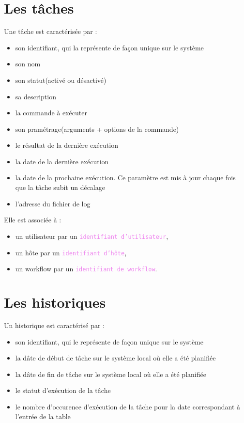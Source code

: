 \documentclass{bouygues-fr}
\begin{document}
\section{Les tâches}
Une tâche est caractérisée par :
\begin{itemize}
\item son identifiant, qui la représente de façon unique sur le système
\item son nom
\item son statut(activé ou désactivé)
\item sa description
\item la commande à exécuter
\item son pramétrage(arguments + options de la commande)
\item le résultat de la dernière exécution
\item la date de la dernière exécution
\item la date de la prochaine exécution. Ce paramètre est mis à jour chaque fois que la tâche subit un décalage
\item l'adresse du fichier de log
\end{itemize} 
 
Elle est associée à :
\begin{itemize}
\item un utilisateur par un \textcolor{violet}{\texttt{identifiant d'utilisateur}},
\item un hôte par un \textcolor{violet}{\texttt{identifiant d'hôte}},
\item un workflow par un \textcolor{violet}{\texttt{identifiant de workflow}}.
\end{itemize}

\section{Les historiques}
Un historique est caractérisé par :
\begin{itemize}
\item son identifiant, qui le représente de façon unique sur le système
\item la dâte de début de tâche sur le système local où elle a été planifiée
\item la dâte de fin de tâche sur le système local où elle a été planifiée
\item le statut d'exécution de la tâche
\item le nombre d'occurence d'exécution de la tâche pour la date correspondant à l'entrée de la table
\end{itemize}
\end{document}

